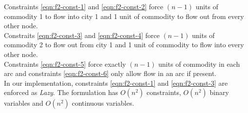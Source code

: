 \noindent Constraints \ref{eqn:f2-const-1} and \ref{eqn:f2-const-2} force $(n-1)$ units of commodity 1 to flow into city 1 and 1 unit of commodity to flow out from every other node.\\
Constraits \ref{eqn:f2-const-3} and \ref{eqn:f2-const-4} force $(n-1)$ units of commodity 2 to flow out from city 1 and 1 unit of commodity to flow into every other node.\\
Constraints \ref{eqn:f2-const-5} force exactly $(n-1)$ units of commodity in each arc and constraints \ref{eqn:f2-const-6} only allow flow in an arc if present.\\
In our implementation, constraints \ref{eqn:f2-const-1} and \ref{eqn:f2-const-3} are enforced as \textit{Lazy}.
The formulation has $O(n^2)$ constraints, $O(n^2)$ binary variables and $O(n^2)$ continuous variables.

